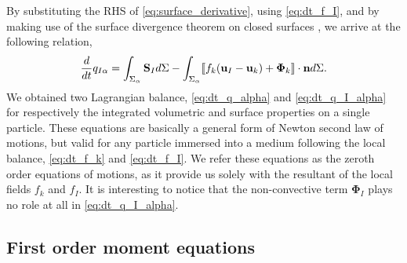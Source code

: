 By substituting the RHS of \ref{eq:surface_derivative}, using \ref{eq:dt_f_I}, and by making use of the surface divergence theorem on closed surfaces \citep{kanwal1998generalized} , we arrive at the following relation,
\begin{equation}
    \frac{d}{d t}  q_{I\alpha}
    = \int_{\Sigma_\alpha} 
        \textbf{S}_I
    d\Sigma
    - \int_{\Sigma_\alpha} \llbracket 
        f_k (\textbf{u}_I - \textbf{u}_k)
        + \mathbf{\Phi}_k
     \rrbracket \cdot \textbf{n}
    d\Sigma.
    \label{eq:dt_q_I_alpha}
\end{equation}
We obtained two Lagrangian balance, \ref{eq:dt_q_alpha} and \ref{eq:dt_q_I_alpha} for respectively the integrated volumetric and surface properties on a single particle.
These equations are basically a general form of Newton second law of motions, but valid for any particle immersed into a medium following the local balance, \ref{eq:dt_f_k} and \ref{eq:dt_f_I}. 
We refer these equations as the zeroth order equations of motions, as it provide us solely with the resultant of the local fields $f_k$ and $f_I$.
It is interesting to notice that the non-convective term $\mathbf{\Phi}_I$ plays no role at all in \ref{eq:dt_q_I_alpha}. 






\subsection{First order moment equations}

